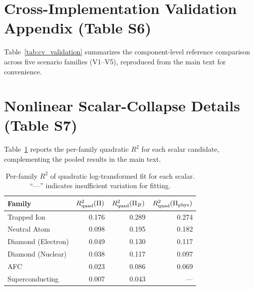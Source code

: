 \documentclass[aps,prapplied,reprint,superscriptaddress]{revtex4-2}
\begin{document}
\section{Cross-Implementation Validation Appendix (Table S6)}

Table~\ref{tab:cv_validation} summarizes the component-level reference comparison across five scenario families (V1--V5), reproduced from the main text for convenience.

\begin{table}[htbp]
\centering
\caption{Component-level reference comparison per scenario. $\rho$ is the Spearman rank correlation between WestQuant and reference-model $A_{\rm req}$. Data: \texttt{v05\_fixes/results/p4\_validation\_breakdown.csv}.}
\label{tab:cv_validation}
\end{table}

\section{Nonlinear Scalar-Collapse Details (Table S7)}

Table~\ref{tab:nonlinear_perfamily} reports the per-family quadratic $R^2$ for each scalar candidate, complementing the pooled results in the main text.

\begin{table}[htbp]
\centering
\caption{Per-family $R^2$ of quadratic log-transformed fit for each scalar. ``---'' indicates insufficient variation for fitting.}
\label{tab:nonlinear_perfamily}
\begin{tabular}{lrrr}
\toprule
Family & $R^2_{\rm quad}(\Pi)$ & $R^2_{\rm quad}(\Pi_B)$ & $R^2_{\rm quad}(\Pi_{\rm phys})$ \\
\midrule
Trapped Ion & 0.176 & 0.289 & 0.274 \\
Neutral Atom & 0.098 & 0.195 & 0.182 \\
Diamond (Electron) & 0.049 & 0.130 & 0.117 \\
Diamond (Nuclear) & 0.038 & 0.117 & 0.097 \\
AFC & 0.023 & 0.086 & 0.069 \\
Superconducting & 0.007 & 0.043 & --- \\
\bottomrule
\end{tabular}
\end{table}
\end{document}
